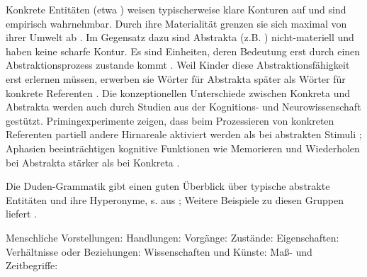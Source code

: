 Konkrete Entitäten (etwa ) weisen typischerweise klare Konturen auf und sind empirisch wahrnehmbar. Durch ihre Materialität grenzen sie sich maximal von ihrer Umwelt ab \parencite[344]{Szczepaniak2011}. Im Gegensatz dazu sind Abstrakta (z.B. ) nicht-materiell und haben keine scharfe Kontur. Es sind Einheiten, deren Bedeutung erst durch einen Abstraktionsprozess zustande kommt \parencite[279]{Ewald1992}. Weil Kinder diese Abstraktionsfähigkeit erst erlernen müssen, erwerben sie Wörter für Abstrakta später als Wörter für konkrete Referenten \parencite[396]{Bergelson2013}. Die konzeptionellen Unterschiede zwischen Konkreta und Abstrakta werden auch durch Studien aus der Kognitions- und Neurowissenschaft gestützt. Primingexperimente zeigen, dass beim Prozessieren von konkreten Referenten partiell andere Hirnareale aktiviert werden als bei abstrakten Stimuli \parencite{Binder2005,Weiss2013}; Aphasien beeinträchtigen kognitive Funktionen wie Memorieren und Wiederholen bei Abstrakta stärker als bei Konkreta \parencite{Moss1995,Moss1997}.

Die Duden-Grammatik gibt einen guten Überblick über typische abstrakte Entitäten und ihre Hyperonyme, s.  aus \textcite[146--147]{Duden2009}; Weitere Beispiele zu diesen Gruppen liefert \textcite[143]{Schrauf2011}.

\begin{exe}
	\ex \label{ex:abstrakta}
	\begin{xlist}
		\ex \label{ex:vorstellung} Menschliche Vorstellungen: 
		\ex \label{ex:handlungen} Handlungen: 
		\ex \label{ex:vorgang} Vorgänge: 
		\ex \label{ex:zustand} Zustände: 
		\ex \label{ex:eigenschaft} Eigenschaften:  
		\ex \label{ex:verhaeltnise} Verhältnisse oder Beziehungen: 
		\ex \label{ex:wissenschaft} Wissenschaften und Künste: 
		\ex \label{ex:zeit} Maß- und Zeitbegriffe: 
	\end{xlist}
\end{exe} 

